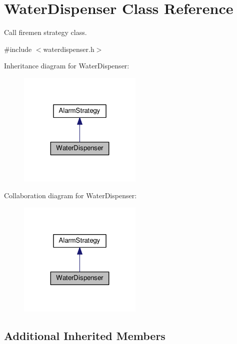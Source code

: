 \hypertarget{classWaterDispenser}{}\section{Water\+Dispenser Class Reference}
\label{classWaterDispenser}


Call firemen strategy class.  




{\ttfamily \#include $<$waterdispenser.\+h$>$}



Inheritance diagram for Water\+Dispenser\+:\nopagebreak
\begin{figure}[H]
\begin{center}
\leavevmode
\includegraphics[width=167pt]{classWaterDispenser__inherit__graph}
\end{center}
\end{figure}


Collaboration diagram for Water\+Dispenser\+:\nopagebreak
\begin{figure}[H]
\begin{center}
\leavevmode
\includegraphics[width=167pt]{classWaterDispenser__coll__graph}
\end{center}
\end{figure}
\subsection*{Additional Inherited Members}


